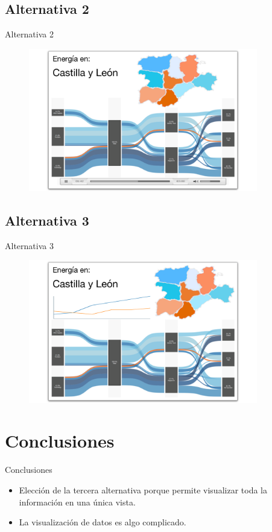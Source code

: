 \documentclass{beamer}
\begin{document}
		\subsection{Alternativa 2}
		
			\begin{frame}{Alternativa 2}
				\begin{figure}[H]
					\centering
					\includegraphics[width=100mm]{../res/design4.png}
				\end{figure}
			\end{frame}
		
		\subsection{Alternativa 3}

			\begin{frame}{Alternativa 3}
				\begin{figure}[H]
					\centering
					\includegraphics[width=100mm]{../res/design5.png}
				\end{figure}
			\end{frame}
		
	\section{Conclusiones}
	
		\begin{frame}{Conclusiones}
		
			\begin{itemize}
			
				\item Elección de la tercera alternativa porque permite visualizar toda la información en una única vista.
				\item La visualización de datos es algo complicado.
			\end{itemize}
		
		\end{frame}
\end{document}
